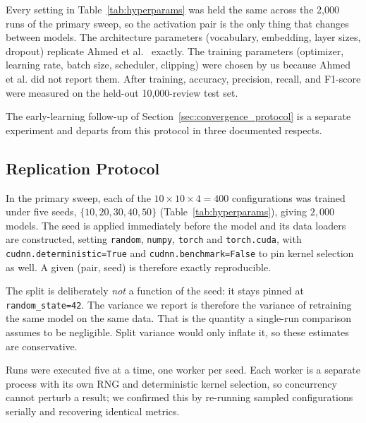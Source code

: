 Every setting in Table~\ref{tab:hyperparams} was held the same
across the 2{,}000 runs of the primary sweep, so the activation
pair is the only thing that changes between models. The
architecture parameters (vocabulary, embedding, layer sizes,
dropout) replicate Ahmed et al.~\cite{ahmed2025} exactly. The
training parameters (optimizer, learning rate, batch size,
scheduler, clipping) were chosen by us because Ahmed et al. did
not report them. After training, accuracy, precision, recall, and
F1-score were measured on the held-out 10,000-review test set.

The early-learning follow-up of
Section~\ref{sec:convergence_protocol} is a separate experiment
and departs from this protocol in three documented respects.

\subsection{Replication Protocol}
\label{sec:replication}

In the primary sweep, each of the $10\times10\times4 = 400$
configurations was trained under five seeds,
$\{10,20,30,40,50\}$ (Table~\ref{tab:hyperparams}), giving
$2{,}000$ models. The seed is applied immediately before the
model and its data loaders are constructed, setting
\texttt{random}, \texttt{numpy}, \texttt{torch} and
\texttt{torch.cuda}, with \texttt{cudnn.deterministic=True} and
\texttt{cudnn.benchmark=False} to pin kernel selection as well.
A given (pair, seed) is therefore exactly reproducible.

The split is deliberately \emph{not} a function of the seed: it
stays pinned at \texttt{random\_state=42}. The variance we report
is therefore the variance of retraining the same model on the same
data. That is the quantity a single-run comparison assumes to be
negligible. Split variance would only inflate it, so these
estimates are conservative.

Runs were executed five at a time, one worker per seed. Each
worker is a separate process with its own RNG and deterministic
kernel selection, so concurrency cannot perturb a result; we
confirmed this by re-running sampled configurations serially and
recovering identical metrics.

